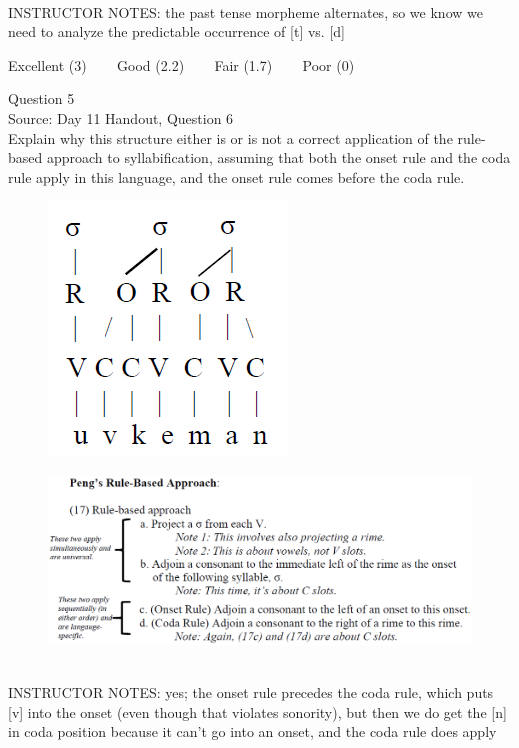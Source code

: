 \documentclass[12pt]{article}
\begin{document}
~\\
INSTRUCTOR NOTES: the past tense morpheme alternates, so we know we need to analyze the predictable occurrence of [t] vs. [d]


\vfill
Excellent (3) ~~~ Good (2.2) ~~~ Fair (1.7) ~~~ Poor (0)
\newpage

{\large Question 5}\\

Source: Day 11 Handout, Question 6\\

Explain why this structure either is or is not a correct application of the rule-based approach to syllabification, assuming that both the onset rule and the coda rule apply in this language, and the onset rule comes before the coda rule.\\

\begin{figure}[H]
\includegraphics{../images/pengrules_uvkeman_yes.png}
\end{figure}
\begin{figure}[H]
\includegraphics{../images/peng_rules.png}
\end{figure}

~\\
INSTRUCTOR NOTES: yes; the onset rule precedes the coda rule, which puts [v] into the onset (even though that violates sonority), but then we do get the [n] in coda position because it can't go into an onset, and the coda rule does apply
\end{document}
